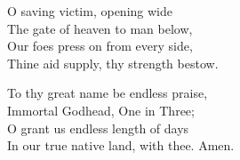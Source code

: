 \documentclass[11pt]{book}
\begin{document}
\thispagestyle{empty}


{}


\begin{multicols}{2}
\raggedcolumns
\begin{otherlanguage}{english}
O saving victim, opening wide\\
The gate of heaven to man below,\\
Our foes press on from every side,\\
Thine aid supply, thy strength bestow.

To thy great name be endless praise,\\
Immortal Godhead, One in Three;\\
O grant us endless length of days\\
In our true native land, with thee.
Amen.
\end{otherlanguage}
\end{multicols}
\end{document}

